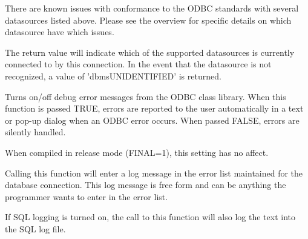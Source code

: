 There are known issues with conformance to the ODBC standards with several
datasources listed above.  Please see the overview for specific details on
which datasource have which issues.


The return value will indicate which of the supported datasources is 
currently connected to by this connection.  In the event that the
datasource is not recognized, a value of 'dbmsUNIDENTIFIED' is returned.

\label{wxdbsetdebugerrormessages}




Turns on/off debug error messages from the ODBC class library.  When
this function is passed TRUE, errors are reported to the user automatically
in a text or pop-up dialog when an ODBC error occurs.  When passed FALSE,
errors are silently handled.

When compiled in release mode (FINAL=1), this setting has no affect.



\label{wxdblogerror}




Calling this function will enter a log message in the error list maintained
for the database connection.  This log message is free form and can be
anything the programmer wants to enter in the error list.

If SQL logging is turned on, the call to this function will also log the
text into the SQL log file.



\section{}\label{wxdbcolinf}

